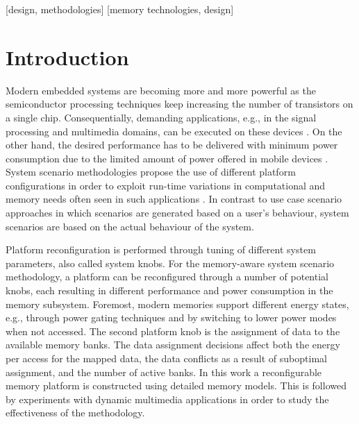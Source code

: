 \documentclass{acm_proc_article-sp}
\begin{document}
[design, methodologies]
[memory technologies, design]


\vfill
\section{Introduction}
\label{sec:introduction}

Modern embedded systems are becoming more and more powerful as the semiconductor processing techniques keep increasing the number of transistors on a single chip. Consequentially, demanding applications, e.g., in the signal processing and multimedia domains, can be executed on these devices \cite{narasinga}. On the other hand, the desired performance has to be delivered with minimum power consumption due to the limited amount of power offered in mobile devices \cite{tcm}. System scenario methodologies propose the use of different platform configurations in order to exploit run-time variations in computational and memory needs often seen in such applications \cite{tcm}. In contrast to use case scenario approaches in which scenarios are generated based on a user's behaviour, system scenarios are based on the actual behaviour of the system.

Platform reconfiguration is performed through tuning of different system parameters, also called system knobs. For the memory-aware system scenario methodology, a platform can be reconfigured through a number of potential knobs, each resulting in different performance and power consumption in the memory subsystem. Foremost, modern memories support different energy states, e.g., through power gating techniques and by switching to lower power modes when not accessed. %
The second platform knob is the assignment of data to the available memory banks. The data assignment decisions affect both the energy per access for the mapped data, the data conflicts as a result of suboptimal assignment, and the number of active banks. In this work a reconfigurable memory platform is constructed using detailed memory models. This is followed by experiments with dynamic multimedia applications in order to study the effectiveness of the methodology.
\end{document}
